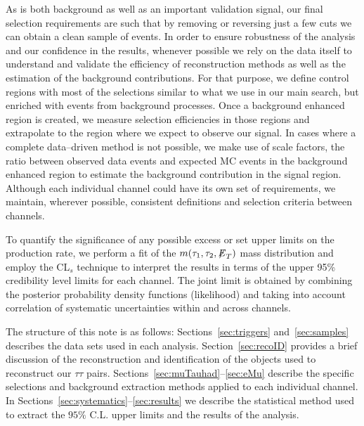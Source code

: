 As \zditau is both background as well as an important validation signal, our final selection requirements are such that by removing or
reversing just a few cuts we can obtain a clean sample of \zditau events. In order to ensure robustness of the analysis and our
confidence in the results, whenever possible we rely on the data itself to understand and validate the efficiency of reconstruction
methods as well as the estimation of the background contributions. For that purpose, we define control regions with most of the
selections similar to what we use in our main search, but enriched with events from background processes. Once a background enhanced
region is created, we measure selection efficiencies in those regions and  extrapolate to the region  where we expect to observe our
signal. In cases where a complete data--driven method is not possible, we make use of scale factors, the ratio between observed data events
and expected MC events in the background enhanced region to estimate the background  contribution in the signal region. Although each
individual channel could have its own set of requirements, we maintain, wherever possible, consistent definitions and selection
criteria  between channels.

To quantify the significance of any possible excess or set upper limits on the production rate, we perform a fit of the $m(\tau_{1},\tau_{2},{\not\mathrel{E}}_T)$ mass 
distribution and employ the CL$_{s}$ technique to interpret the results in terms of the upper 95\% credibility level limits
for each channel. The joint limit is obtained by combining the posterior probability density functions (likelihood) and taking into
account correlation of systematic uncertainties within and across channels.

The structure of this note is as follows: Sections~\ref{sec:triggers} and~\ref{sec:samples} describes the data sets used in each analysis. 
Section~\ref{sec:recoID} provides a brief discussion of the reconstruction and identification of the objects used to reconstruct our  $\tau\tau$ 
pairs.
Sections~\ref{sec:muTauhad}--\ref{sec:eMu} describe the specific selections and background extraction methods applied  to each
individual channel. In Sections~\ref{sec:systematics}--\ref{sec:results} we describe the statistical method used to extract 
the $95\%$ C.L. upper limits and the results of the analysis. 
  
